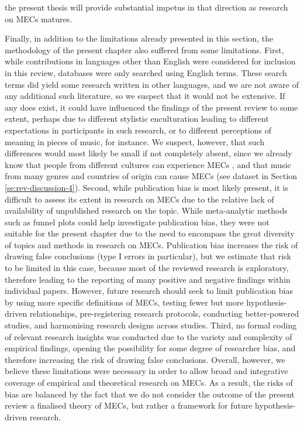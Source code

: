 the present thesis will provide substantial impetus in that direction as research on MECs matures.

Finally, in addition to the limitations already presented in this section, the methodology of the present chapter also suffered from some limitations. First, while contributions in languages other than English were considered for inclusion in this review, databases were only searched using English terms. These search terms did yield some research written in other languages, and we are not aware of any additional such literature, so we suspect that it would not be extensive. If any does exist, it could have influenced the findings of the present review to some extent, perhaps due to different stylistic enculturation leading to different expectations in participants in such research, or to different perceptions of meaning in pieces of music, for instance. We suspect, however, that such differences would most likely be small if not completely absent, since we already know that people from different cultures can experience MECs \parencite{beier2020}, and that music from many genres and countries of origin can cause MECs (see dataset in Section \ref{se:rev-discussion-4}). Second, while publication bias is most likely present, it is difficult to assess its extent in research on MECs due to the relative lack of availability of unpublished research on the topic. While meta-analytic methods such as funnel plots could help investigate publication bias, they were not suitable for the present chapter due to the need to encompass the great diversity of topics and methods in research on MECs. Publication bias increases the risk of drawing false conclusions (type I errors in particular), but we estimate that risk to be limited in this case, because most of the reviewed research is exploratory, therefore leading to the reporting of many positive and negative findings within individual papers. However, future research should seek to limit publication bias by using more specific definitions of MECs, testing fewer but more hypothesis-driven relationships, pre-registering research protocols, conducting better-powered studies, and harmonising research designs across studies. Third, no formal coding of relevant research insights was conducted due to the variety and complexity of empirical findings, opening the possibility for some degree of researcher bias, and therefore increasing the risk of drawing false conclusions. Overall, however, we believe these limitations were necessary in order to allow broad and integrative coverage of empirical and theoretical research on MECs. As a result, the risks of bias are balanced by the fact that we do not consider the outcome of the present review a finalised theory of MECs, but rather a framework for future hypothesis-driven research.

